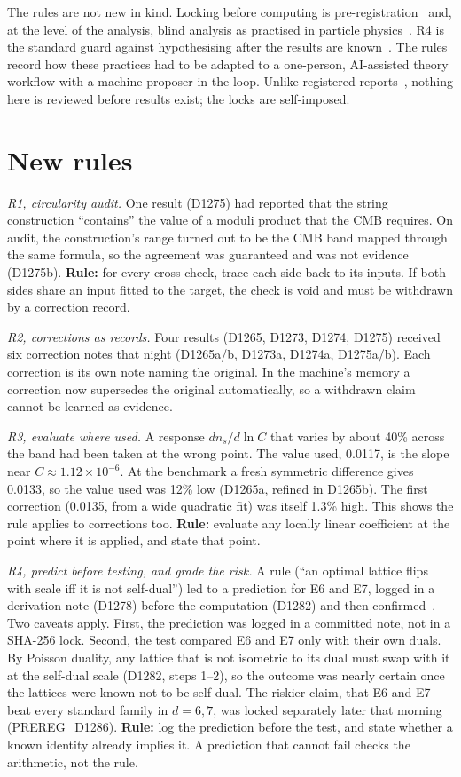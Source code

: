 \documentclass[aps,prd,twocolumn,superscriptaddress,nofootinbib,showkeys]{revtex4-2}
\begin{document}
The rules are not new in kind. Locking before computing is pre-registration~\cite{Nosek} and, at the level of the analysis, blind analysis as practised in particle physics~\cite{Klein}. R4 is the standard guard against hypothesising after the results are known~\cite{Kerr}. The rules record how these practices had to be adapted to a one-person, AI-assisted theory workflow with a machine proposer in the loop. Unlike registered reports~\cite{Chambers}, nothing here is reviewed before results exist; the locks are self-imposed.

\section{New rules}
\emph{R1, circularity audit.} One result (D1275) had reported that the string construction ``contains'' the value of a moduli product that the CMB requires. On audit, the construction's range turned out to be the CMB band mapped through the same formula, so the agreement was guaranteed and was not evidence (D1275b). \textbf{Rule:} for every cross-check, trace each side back to its inputs. If both sides share an input fitted to the target, the check is void and must be withdrawn by a correction record.

\emph{R2, corrections as records.} Four results (D1265, D1273, D1274, D1275) received six correction notes that night (D1265a/b, D1273a, D1274a, D1275a/b). Each correction is its own note naming the original. In the machine's memory a correction now supersedes the original automatically, so a withdrawn claim cannot be learned as evidence.

\emph{R3, evaluate where used.} A response $dn_s/d\ln C$ that varies by about 40\% across the band had been taken at the wrong point. The value used, 0.0117, is the slope near $C\approx1.12\times10^{-6}$. At the benchmark a fresh symmetric difference gives 0.0133, so the value used was 12\% low (D1265a, refined in D1265b). The first correction (0.0135, from a wide quadratic fit) was itself 1.3\% high. This shows the rule applies to corrections too. \textbf{Rule:} evaluate any locally linear coefficient at the point where it is applied, and state that point.

\emph{R4, predict before testing, and grade the risk.} A rule (``an optimal lattice flips with scale iff it is not self-dual'') led to a prediction for E6 and E7, logged in a derivation note (D1278) before the computation (D1282) and then confirmed~\cite{SSD}. Two caveats apply. First, the prediction was logged in a committed note, not in a SHA-256 lock. Second, the test compared E6 and E7 only with their own duals. By Poisson duality, any lattice that is not isometric to its dual must swap with it at the self-dual scale (D1282, steps 1--2), so the outcome was nearly certain once the lattices were known not to be self-dual. The riskier claim, that E6 and E7 beat every standard family in $d=6,7$, was locked separately later that morning (PREREG\_D1286). \textbf{Rule:} log the prediction before the test, and state whether a known identity already implies it. A prediction that cannot fail checks the arithmetic, not the rule.
\end{document}
